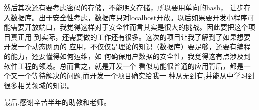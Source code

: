 然后其次还有要考虑密码的存储，不能明文存储，所以要用单向的hash，
让步存入数据库。出于安全性考虑，数据库只对localhost开放。以后如果要开发小程序可
能需要开放端口，我觉得这样对于安全性而言其实是很大的挑战。因此要把这个项目真正用
到实际，还需要做的工作还有很多。这次的项目让我了解到了如果想要开发一个动态网页的
应用，不仅仅是理论的知识（数据库）要足够，还要有编程的能力，还要懂得如何运维，如
何确保用户数据的安全性，我觉得这有点涉及到软件工程的领域。总而言之，就是开发一个
看似功能很普通的应用背后，都是一个又一个等待解决的问题,而开发一个项目确实给我一
种从无到有,并能从中学习到很多相关领域的知识。

最后,感谢辛苦半年的助教和老师。